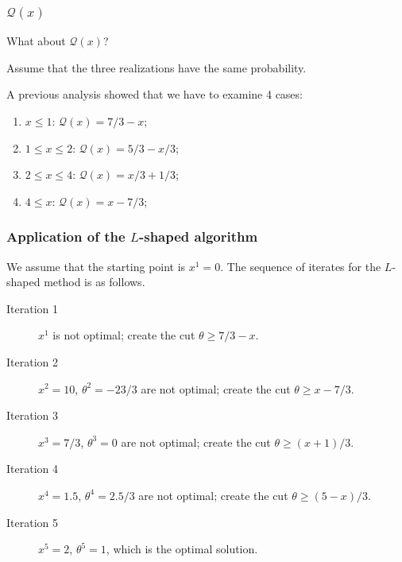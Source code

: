 \documentclass{beamer}
\begin{document}
\begin{frame}
\frametitle{$\mathcal{Q}(x)$}
	
What about $\mathcal{Q}(x)$?
	
\mbox{}
	
Assume that the three realizations have the same probability.
	
\mbox{}
	
A previous analysis showed that we have to examine 4 cases:
\begin{enumerate}
\item
$x \leq 1$: $\mathcal{Q}(x) = 7/3 - x$;
\item
$1 \leq x \leq 2$: $\mathcal{Q}(x) = 5/3-x/3$;
\item
$2 \leq x \leq 4$: $\mathcal{Q}(x) = x/3+1/3$;
\item
$4 \leq x$: $\mathcal{Q}(x) = x-7/3$;
\end{enumerate}
	
\end{frame}

\begin{frame}
\frametitle{Application of the $L$-shaped algorithm}
	
We assume that the starting point is $x^1 = 0$.
The sequence of iterates for the $L$-shaped method is as follows.

\mbox{}
	
\begin{description}
\item[Iteration 1] $x^1$ is not optimal; create the cut $\theta \geq 7/3 - x$.
\item[Iteration 2] $x^2 = 10$, $\theta^2 = -23/3$ are not optimal; create the cut $\theta \geq x- 7/3$.
\item[Iteration 3] $x^3 = 7/3$, $\theta^3 = 0$ are not optimal; create the cut $\theta \geq (x+1)/3$.
\item[Iteration 4] $x^4 = 1.5$, $\theta^4 = 2.5/3$ are not optimal; create the cut $\theta \geq (5-x)/3$.
\item[Iteration 5] $x^5 = 2$, $\theta^5 = 1$, which is the optimal solution.
\end{description}
	
\end{frame}
\end{document}
